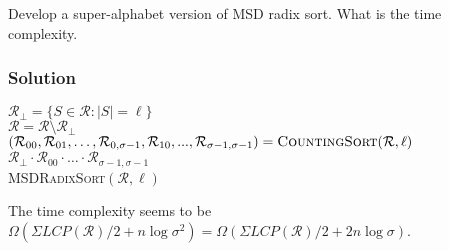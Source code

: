 \documentclass[10pt]{article}
\begin{document}
\noindent Develop a super-alphabet version of MSD radix sort. What is the time complexity.
\color{black}

\subsubsection*{Solution}
\begin{algorithm}
$\mathcal{R}_{\bot} = \{ S \in \mathcal{R} \colon |S| = \ell \}$ \\
$\mathcal{R} = \mathcal{R} \setminus \mathcal{R}_{\bot}$ \\
$(\mathcal{R}_{00}, \mathcal{R}_{01}, \dots, \mathcal{R}_{0,\sigma - 1}, \mathcal{R}_{10}, ..., \mathcal{R}_{\sigma - 1, \sigma - 1}) = \textsc{CountingSort}(\mathcal{R}, \ell)$ \\
\KwRet $\mathcal{R}_{\bot} \cdot \mathcal{R}_{00} \cdot \dots \cdot \mathcal{R}_{\sigma - 1, \sigma - 1}$ \\
\caption{\textsc{MSDRadixSort}$(\mathcal{R}, \ell)$}
\end{algorithm}
The time complexity seems to be $\Omega(\Sigma LCP(\mathcal{R})/ 2 + n \log \sigma^2) = \Omega(\Sigma LCP(\mathcal{R})/2 + 2n \log \sigma)$.
\end{document}
